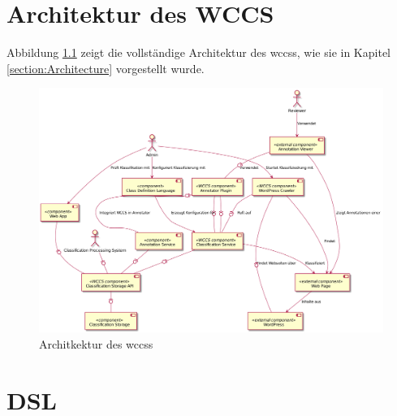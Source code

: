\chapter{Architektur des WCCS}
    Abbildung \ref{image:wccsExternalArchitecture} zeigt die vollständige Architektur des \glspl{wccs},
    wie sie in Kapitel \ref{section:Architecture} vorgestellt wurde.

    \begin{figure}[htb]
        \centering
        \includegraphics[width=\textwidth]{../resources/architecture/complete_architecture.png}
        \caption{Architkektur des \glspl{wccs}}
        \label{image:wccsExternalArchitecture}
    \end{figure}

\chapter{DSL}
